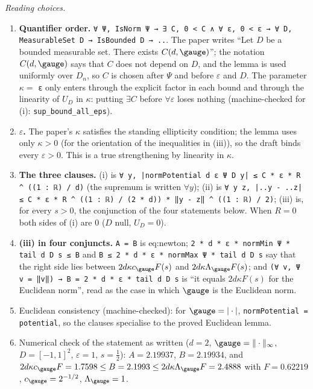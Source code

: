 \emph{Reading choices.}
\begin{enumerate}
\item \textbf{Quantifier order.} \verb!∀ Ψ, IsNorm Ψ → ∃ C, 0 < C ∧ ∀ ε, 0 < ε → ∀ D, MeasurableSet D → IsBounded D → ..!. The paper writes ``Let $D$ be a bounded measurable set. There exists $C(d,\gauge)$''; the notation $C(d,\gauge)$ says that $C$ does not depend on $D$, and the lemma is used uniformly over $D_n$, so $C$ is chosen after $\Psi$ and before $\varepsilon$ and $D$. The parameter $\kappa=$ \verb!ε! only enters through the explicit factor in each bound and through the linearity of $U_D$ in $\kappa$: putting $\exists C$ before $\forall\varepsilon$ loses nothing (machine-checked for (i): \verb!sup_bound_all_eps!).
\item \textbf{$\varepsilon$.} The paper's $\kappa$ satisfies the standing ellipticity condition; the lemma uses only $\kappa>0$ (for the orientation of the inequalities in (iii)), so the draft binds every $\varepsilon>0$. This is a true strengthening by linearity in $\kappa$.
\item \textbf{The three clauses.} (i) is \verb!∀ y, |normPotential d ε Ψ D y| ≤ C * ε * R ^ ((1 : ℝ) / d)! (the supremum is written $\forall y$); (ii) is \verb!∀ y z, |..y - ..z| ≤ C * ε * R ^ ((1 : ℝ) / (2 * d)) * ‖y - z‖ ^ ((1 : ℝ) / 2)!; (iii) is, for every $s>0$, the conjunction of the four statements below. When $R=0$ both sides of (i) are $0$ ($D$ null, $U_D=0$).
\item \textbf{(iii) in four conjuncts.} \verb!A = B! is eq:newton; \verb!2 * d * ε * normMin Ψ * tail d D s ≤ B! and \verb!B ≤ 2 * d * ε * normMax Ψ * tail d D s! say that the right side lies between $2d\kappa c_\gauge F(s)$ and $2d\kappa\Lambda_\gauge F(s)$; and \verb!(∀ v, Ψ v = ‖v‖) → B = 2 * d * ε * tail d D s! is ``it equals $2d\kappa F(s)$ for the Euclidean norm'', read as the case in which $\gauge$ is the Euclidean norm.
\item Euclidean consistency (machine-checked): for $\gauge=|\cdot|$, \verb!normPotential = potential!, so the clauses specialise to the proved Euclidean lemma.
\item Numerical check of the statement as written ($d=2$, $\gauge=\|\cdot\|_\infty$, $D=[-1,1]^2$, $\varepsilon=1$, $s=\tfrac12$): $A=2.19937$, $B=2.19934$, and $2d\kappa c_\gauge F=1.7598\le B=2.1993\le2d\kappa\Lambda_\gauge F=2.4888$ with $F=0.62219$, $c_\gauge=2^{-1/2}$, $\Lambda_\gauge=1$.
\end{enumerate}
